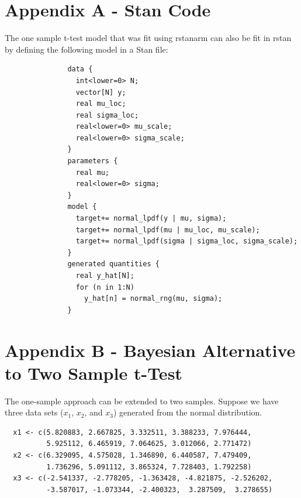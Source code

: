 \documentclass[12pt]{article}
\begin{document}
\pagebreak

\section{Appendix A - Stan Code}

\noindent The one sample t-test model that was fit using rstanarm can also be fit in rstan by defining the following model in a Stan file:

\begin{verbatim}
               data {
                 int<lower=0> N;
                 vector[N] y;
                 real mu_loc;
                 real sigma_loc;
                 real<lower=0> mu_scale;
                 real<lower=0> sigma_scale;
               }
               parameters {
                 real mu;
                 real<lower=0> sigma;
               }
               model {
                 target+= normal_lpdf(y | mu, sigma);
                 target+= normal_lpdf(mu | mu_loc, mu_scale);
                 target+= normal_lpdf(sigma | sigma_loc, sigma_scale);
               }
               generated quantities {
                 real y_hat[N];
                 for (n in 1:N)
                   y_hat[n] = normal_rng(mu, sigma);
               }

\end{verbatim}

\pagebreak

\section{Appendix B - Bayesian Alternative to Two Sample t-Test}

The one-sample approach can be extended to two samples. Suppose we have three data sets ($x_1$, $x_2$, and $x_3$) generated from the normal distribution.

\begin{verbatim}
  x1 <- c(5.820883, 2.667825, 3.332511, 3.388233, 7.976444,
          5.925112, 6.465919, 7.064625, 3.012066, 2.771472)
  x2 <- c(6.329095, 4.575028, 1.346890, 6.440587, 7.479409,
          1.736296, 5.091112, 3.865324, 7.728403, 1.792258)
  x3 <- c(-2.541337, -2.778205, -1.363428, -4.821875, -2.526202,
          -3.587017, -1.073344, -2.400323,  3.287509,  3.278655)
\end{verbatim}
\end{document}
